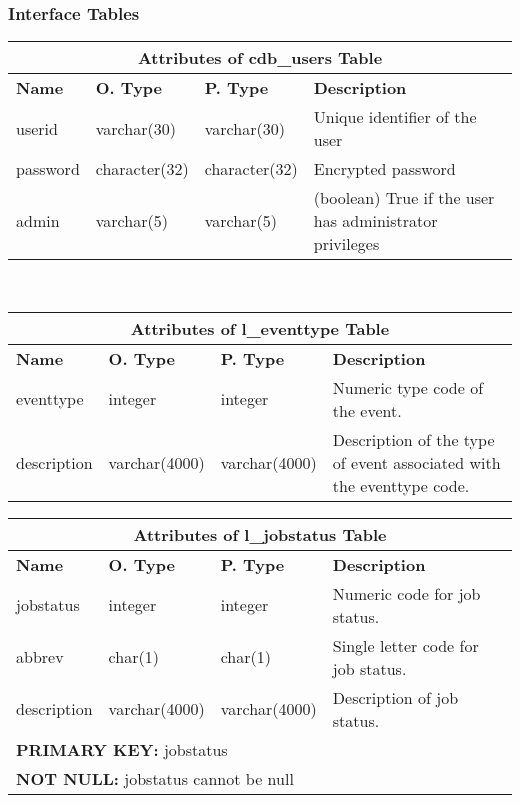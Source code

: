 \subsubsection{Interface Tables}
\begin{center}
  \begin{tabular}{|l|l|l|p{3.4in}|}\hline
    \multicolumn{4}{|c|}{\textbf{Attributes of cdb\_users Table}}\\ \hline
    \textbf{Name} & \textbf{O. Type} & \textbf{P. Type} & \textbf{Description}\\ \hline
    userid & varchar(30) & varchar(30) & Unique identifier of the user\\ \hline
    password & character(32) & character(32) & Encrypted password\\ \hline
    admin & varchar(5) & varchar(5) & (boolean) True if the user has administrator privileges\\ \hline
  \end{tabular}\\
\vspace{24pt}

  \begin{tabular}{|l|l|l|p{3.2in}|}\hline
    \multicolumn{4}{|c|}{\textbf{Attributes of l\_eventtype Table}}\\ \hline
    \textbf{Name} & \textbf{O. Type} & \textbf{P. Type} & \textbf{Description}\\ \hline
    eventtype & integer & integer & Numeric type code of the event.\\ \hline
    description & varchar(4000) & varchar(4000) & Description of the type of event associated with the eventtype code.\\ \hline
  \end{tabular}
\vspace{24pt}

  \begin{tabular}{|l|l|l|p{3.2in}|}\hline
    \multicolumn{4}{|c|}{\textbf{Attributes of l\_jobstatus Table}}\\ \hline
    \textbf{Name} & \textbf{O. Type} & \textbf{P. Type} & \textbf{Description}\\ \hline
    jobstatus & integer & integer & Numeric code for job status.\\ \hline
    abbrev & char(1) & char(1) & Single letter code for job status.\\ \hline
    description & varchar(4000) & varchar(4000) & Description of job status.\\ \hline
    \multicolumn{4}{|l|}{\textbf{PRIMARY KEY:} jobstatus} \\ \hline
    \multicolumn{4}{|l|}{\textbf{NOT NULL:} jobstatus cannot be null} \\ \hline
  \end{tabular}
\vspace{24pt}
\end{center}


